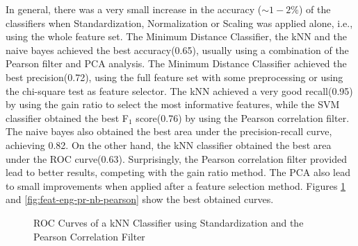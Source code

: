 In general, there was a very small increase in the accuracy ($\sim 1-2\%$) of the classifiers when Standardization, Normalization or Scaling was applied alone, i.e., using the whole feature set. The Minimum Distance Classifier, the kNN and the naive bayes achieved the best accuracy(0.65), usually using a combination of the Pearson filter and PCA analysis. The Minimum Distance Classifier achieved the best precision(0.72), using the full feature set with some preprocessing or using the chi-square test as feature selector. The kNN achieved a very good recall(0.95) by using the gain ratio to select the most informative features, while the SVM classifier obtained the best F$_1$ score(0.76) by using the Pearson correlation filter. The naive bayes also obtained the best area under the precision-recall curve, achieving 0.82. On the other hand, the kNN classifier obtained the best area under the ROC curve(0.63). Surprisingly, the Pearson correlation filter provided lead to better results, competing with the gain ratio method. The PCA also lead to small improvements when applied after a feature selection method. Figures \ref{fig:feat-eng-roc-knn-pearson} and \ref{fig:feat-eng-pr-nb-pearson} show the best obtained curves. 

\begin{figure}[H]
	\centering
	\caption[ROC Curves of a kNN Classifier using Standardization and the Pearson Correlation Filter]{ROC Curves of a kNN Classifier using Standardization and the Pearson Correlation Filter}
	\label{fig:feat-eng-roc-knn-pearson}
\end{figure}

